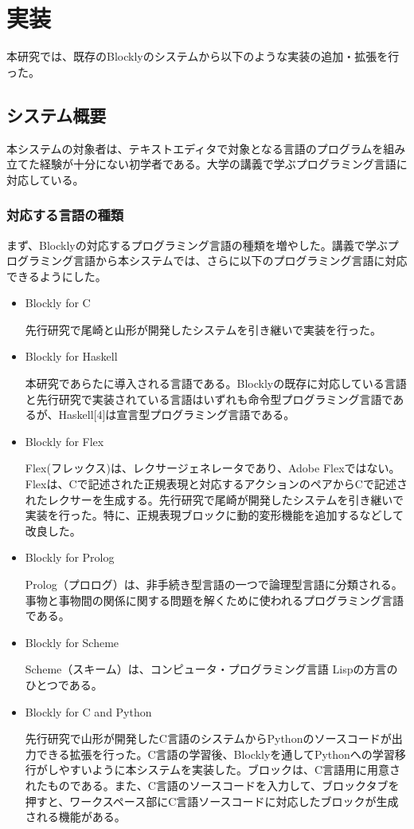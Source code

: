 \documentclass{risepaper}
\begin{document}
   \chapter{実装}
   
本研究では、既存のBlocklyのシステムから以下のような実装の追加・拡張を行った。
    
   \section{システム概要}

本システムの対象者は、テキストエディタで対象となる言語のプログラムを組み立てた経験が十分にない初学者である。大学の講義で学ぶプログラミング言語に対応している。
   
   \subsection{対応する言語の種類}
   
まず、Blocklyの対応するプログラミング言語の種類を増やした。講義で学ぶプログラミング言語から本システムでは、さらに以下のプログラミング言語に対応できるようにした。

\begin{itemize}
\item Blockly for C

先行研究で尾崎と山形が開発したシステムを引き継いで実装を行った。

\item Blockly for Haskell

本研究であらたに導入される言語である。Blocklyの既存に対応している言語と先行研究で実装されている言語はいずれも命令型プログラミング言語であるが、Haskell[4]は宣言型プログラミング言語である。

\item Blockly for Flex

Flex\cite{flex}(フレックス)は、レクサージェネレータであり、Adobe Flex\texttrademark ではない。Flexは、Cで記述された正規表現と対応するアクションのペアからCで記述されたレクサーを生成する。先行研究で尾崎が開発したシステムを引き継いで実装を行った。特に、正規表現ブロックに動的変形機能を追加するなどして改良した。

\item Blockly for Prolog

Prolog（プロログ）は、非手続き型言語の一つで論理型言語に分類される。事物と事物間の関係に関する問題を解くために使われるプログラミング言語である。

\item Blockly for Scheme

Scheme（スキーム）は、コンピュータ・プログラミング言語 Lispの方言のひとつである。

\item Blockly for C and Python

先行研究で山形が開発したC言語のシステムからPythonのソースコードが出力できる拡張を行った。C言語の学習後、Blocklyを通してPythonへの学習移行がしやすいように本システムを実装した。ブロックは、C言語用に用意されたものである。また、C言語のソースコードを入力して、ブロックタブを押すと、ワークスペース部にC言語ソースコードに対応したブロックが生成される機能がある。

\end{itemize} 
   
\end{document}
